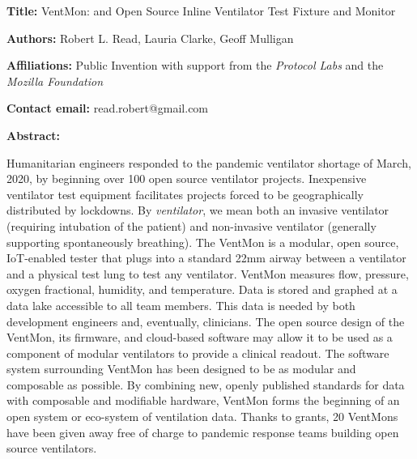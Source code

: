 \documentclass[11pt, letterpaper]{article}
\begin{document}
\begin{flushleft}


\setlength{\parindent}{0pt}
\setlength{\parskip}{10pt}

\textbf{Title:} VentMon: and Open Source Inline Ventilator Test Fixture and Monitor

\textbf{Authors:} Robert L. Read, Lauria Clarke, Geoff Mulligan

\textbf{Affiliations:} Public Invention with support from the \textit{Protocol Labs} and the \textit{Mozilla Foundation}

\textbf{Contact email:} read.robert@gmail.com

\textbf{Abstract:}

Humanitarian engineers responded to the pandemic ventilator shortage of March, 2020, by beginning over 100 open source ventilator projects\cite{COVID19VENTLIST,pearce2020review}. Inexpensive ventilator test equipment facilitates projects forced to be geographically distributed by lockdowns. By {\em ventilator}, we mean both an invasive ventilator (requiring intubation of the patient) and non-invasive ventilator (generally supporting spontaneously breathing). The VentMon is a modular, open source, IoT-enabled tester that plugs into a standard 22mm airway between a ventilator and a physical test lung to test any ventilator. VentMon measures flow, pressure, oxygen fractional, humidity, and temperature. Data is stored and graphed at a data lake accessible to all team members. This data is needed by both development engineers and, eventually, clinicians. The open source design of the VentMon, its firmware, and cloud-based software may allow it to be used as a component of modular ventilators to provide a clinical readout. The software system surrounding VentMon has been designed to be as modular and composable as possible. By combining new, openly published standards for data with composable and modifiable hardware, VentMon forms the beginning of an open system or eco-system of ventilation data. Thanks to grants, 20 VentMons have been given away free of charge to pandemic response teams building open source ventilators.



\end{flushleft}
\end{document}
